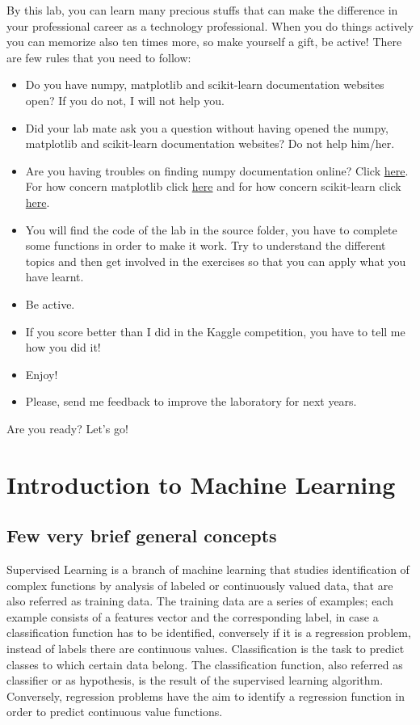 \documentclass[aps,letterpaper,10pt]{revtex4}
\begin{document}
By this lab, you can learn many precious stuffs that can make the difference in your professional career as a technology professional. When you do things actively you can memorize also ten times more, so make yourself a gift, be active! There are few rules that you need to follow:
\begin{itemize}
\item Do you have numpy, matplotlib and scikit-learn documentation websites open? If you do not, I will not help you.
\item Did your lab mate ask you a question without having opened the numpy, matplotlib and scikit-learn  documentation websites? Do not help him/her.
\item Are you having troubles on finding numpy documentation online? Click  \href{http://lmgtfy.com/?q=numpy+doc}{here}. For how concern matplotlib click \href{http://lmgtfy.com/?q=matplotlib}{here} and for how concern scikit-learn click \href{http://lmgtfy.com/?q=scikit-learn}{here}.
\item{You will find the code of the lab in the source folder, you have to complete some functions in order to make it work. Try to understand the different topics and then get involved in the exercises so that you can apply what you have learnt.}
\item{Be active.}
\item{If you score better than I did in the Kaggle competition, you have to tell me how you did it!}
\item{Enjoy!}
\item{Please, send me feedback to improve the laboratory for next years.}
\end{itemize}
Are you ready? Let's go!

\section{Introduction to Machine Learning}
\subsection{Few very brief general concepts}
Supervised Learning is a branch of machine learning that studies identification of complex functions by analysis of labeled or continuously valued data, that are also referred as training data. The training data are a series of examples; each example consists of a features vector and the corresponding label, in case a classification function has to be identified, conversely if it is a regression problem, instead of labels there are continuous values. Classification is the task to predict classes to which certain data belong. The classification function, also referred as classifier or as hypothesis, is the result of the supervised learning algorithm. Conversely, regression problems have the aim to identify a regression function in order to predict continuous value functions. 
\end{document}
